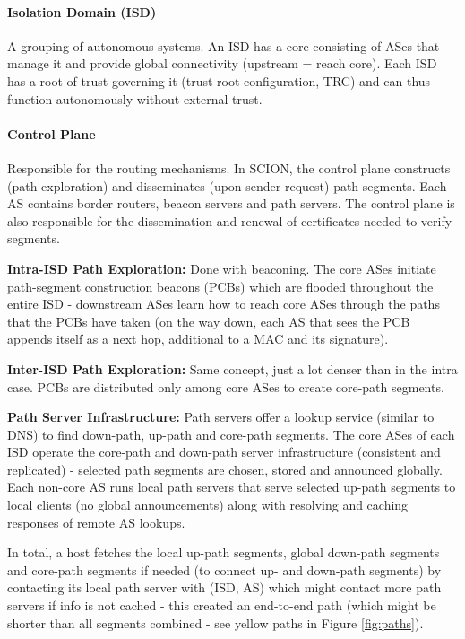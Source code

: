 \paragraph{Isolation Domain (ISD)}
A grouping of autonomous systems. An ISD has a core consisting of ASes that manage it and provide global connectivity (upstream = reach core). Each ISD has a root of trust governing it (trust root configuration, TRC) and can thus function autonomously without external trust.

\paragraph{Control Plane}
Responsible for the routing mechanisms. In SCION, the control plane constructs (path exploration) and disseminates (upon sender request) path segments. Each AS contains border routers, beacon servers and path servers. The control plane is also responsible for the dissemination and renewal of certificates needed to verify segments.

\textbf{Intra-ISD Path Exploration:} Done with beaconing. The core ASes initiate path-segment construction beacons (PCBs) which are flooded throughout the entire ISD - downstream ASes learn how to reach core ASes through the paths that the PCBs have taken (on the way down, each AS that sees the PCB appends itself as a next hop, additional to a MAC and its signature).

\textbf{Inter-ISD Path Exploration:} Same concept, just a lot denser than in the intra case. PCBs are distributed only among core ASes to create core-path segments.

\textbf{Path Server Infrastructure:} Path servers offer a lookup service (similar to DNS) to find down-path, up-path and core-path segments. The core ASes of each ISD operate the core-path and down-path server infrastructure (consistent and replicated) - selected path segments are chosen, stored and announced globally. Each non-core AS runs local path servers that serve selected up-path segments to local clients (no global announcements) along with resolving and caching responses of remote AS lookups.

In total, a host fetches the local up-path segments, global down-path segments and core-path segments if needed (to connect up- and down-path segments) by contacting its local path server with (ISD, AS) which might contact more path servers if info is not cached - this created an end-to-end path (which might be shorter than all segments combined - see yellow paths in Figure \ref{fig:paths}).

